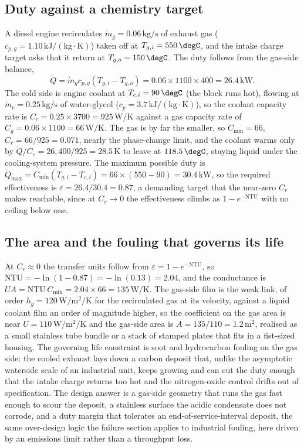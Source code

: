 \subsection{Duty against a chemistry target}

A diesel engine recirculates $\dot{m}_g = 0.06\,\text{kg/s}$ of exhaust gas
($c_{p,g} = 1.10\,\text{kJ}/(\text{kg}\cdot\si{\kelvin})$) taken off at
$T_{g,i} = 550\,\degC$, and the intake charge target asks that it return at
$T_{g,o} = 150\,\degC$. The duty follows from the gas-side balance,
\[
\dot{Q} = \dot{m}_g c_{p,g}(T_{g,i} - T_{g,o}) = 0.06\times 1100\times 400 =
26.4\,\text{kW}.
\]
The cold side is engine coolant at $T_{c,i} = 90\,\degC$ (the block runs hot),
flowing at $\dot{m}_c = 0.25\,\text{kg/s}$ of water-glycol
($c_p = 3.7\,\text{kJ}/(\text{kg}\cdot\si{\kelvin})$), so the coolant capacity rate
is $C_c = 0.25\times 3700 = 925\,\si{\watt\per\kelvin}$ against a gas capacity rate
of $C_g = 0.06\times 1100 = 66\,\si{\watt\per\kelvin}$. The gas is by far the
smaller, so $C_{\min} = 66$, $C_r = 66/925 = 0.071$, nearly the phase-change limit,
and the coolant warms only by $\dot{Q}/C_c = 26{,}400/925 = 28.5\,\si{\kelvin}$ to
leave at $118.5\,\degC$, staying liquid under the cooling-system pressure. The
maximum possible duty is $\dot{Q}_{\max} = C_{\min}(T_{g,i} - T_{c,i}) = 66\times
(550 - 90) = 30.4\,\text{kW}$, so the required effectiveness is $\varepsilon =
26.4/30.4 = 0.87$, a demanding target that the near-zero $C_r$ makes reachable, since
at $C_r \to 0$ the effectiveness climbs as $1 - e^{-\text{NTU}}$ with no ceiling
below one.

\subsection{The area and the fouling that governs its life}

At $C_r \approx 0$ the transfer units follow from $\varepsilon = 1 -
e^{-\text{NTU}}$, so $\text{NTU} = -\ln(1 - 0.87) = -\ln(0.13) = 2.04$, and the
conductance is $UA = \text{NTU}\,C_{\min} = 2.04\times 66 = 135\,\text{W}/\si{
\kelvin}$. The gas-side film is the weak link, of order $h_g = 120\,\si{\watt\per
\meter\squared\per\kelvin}$ for the recirculated gas at its velocity, against a
liquid coolant film an order of magnitude higher, so the coefficient on the gas
area is near $U = 110\,\si{\watt\per\meter\squared\per\kelvin}$ and the gas-side
area is $A = 135/110 = 1.2\,\text{m}^2$, realised as a small stainless tube bundle
or a stack of stamped plates that fits in a fist-sized housing. The governing life
constraint is soot and hydrocarbon fouling on the gas side: the cooled exhaust
lays down a carbon deposit that, unlike the asymptotic waterside scale of an
industrial unit, keeps growing and can cut the duty enough that the intake charge
returns too hot and the nitrogen-oxide control drifts out of specification. The
design answer is a gas-side geometry that runs the gas fast enough to scour the
deposit, a stainless surface the acidic condensate does not corrode, and a duty
margin that tolerates an end-of-service-interval deposit, the same over-design logic
the failure section applies to industrial fouling, here driven by an emissions
limit rather than a throughput loss.


